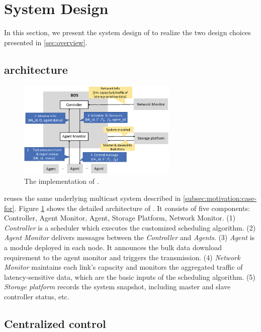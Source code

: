 \section{System Design}
\label{sec:system}

In this section, we present the system design of \name to realize the two design choices presented in \Section\ref{sec:overview}.

\subsection{\name architecture}
\label{subsec:system:architecture}

\begin{figure}[htbp]
  \centering
  \includegraphics[width=3in]{images/implementation.eps}
  \caption{The implementation of \name.}
  \label{fig:implementation}
\end{figure}

\name reuses the same underlying multicast system described in \Section\ref{subsec:motivation:case-for}. Figure \ref{fig:implementation} shows the detailed architecture of \name. It consists of five components: Controller, Agent Monitor, Agent, Storage Platform, Network Monitor. (1) \emph{Controller} is a scheduler which executes the customized scheduling algorithm. (2) \emph{Agent Monitor} delivers messages between the \emph{Controller} and \emph{Agents}. (3) \emph{Agent} is a module deployed in each node. It announces the bulk data download requirement to the agent monitor and triggers the transmission. (4) \emph{Network Monitor} maintains each link's capacity and monitors the aggregated traffic of latency-sensitive data, which are the basic inputs of the scheduling algorithm. (5) \emph{Storage platform} records the system snapshot, including master and slave controller status, etc.

\subsection{Centralized control}
\label{subsec:system:centralized}

